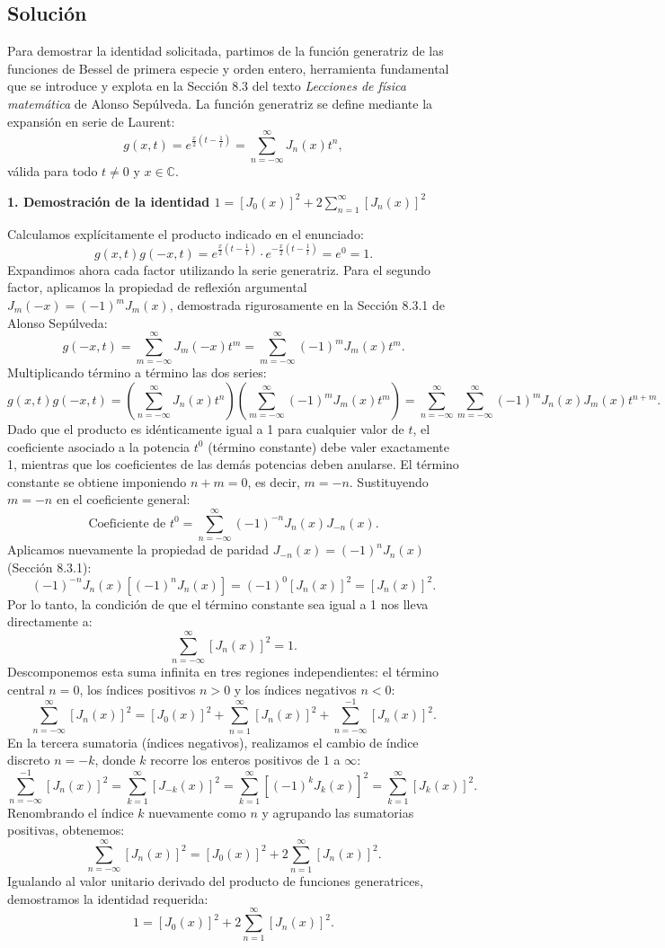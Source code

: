 \documentclass[a4paper]{article}
\begin{document}
\subsection{Solución}
Para demostrar la identidad solicitada, partimos de la función generatriz de las funciones de Bessel de primera especie y orden entero, herramienta fundamental que se introduce y explota en la Sección 8.3 del texto \textit{Lecciones de física matemática} de Alonso Sepúlveda. La función generatriz se define mediante la expansión en serie de Laurent:
$$g(x, t) = e^{\frac{x}{2}\left(t - \frac{1}{t}\right)} = \sum_{n=-\infty}^{\infty} J_n(x) t^n,$$
válida para todo $t \neq 0$ y $x \in \mathbb{C}$.

\textbf{1. Demostración de la identidad $1=[J_0(x)]^2+2\sum_{n=1}^{\infty}[J_n(x)]^2$}

Calculamos explícitamente el producto indicado en el enunciado:
$$g(x, t)g(-x, t) = e^{\frac{x}{2}\left(t - \frac{1}{t}\right)} \cdot e^{-\frac{x}{2}\left(t - \frac{1}{t}\right)} = e^0 = 1.$$
Expandimos ahora cada factor utilizando la serie generatriz. Para el segundo factor, aplicamos la propiedad de reflexión argumental $J_m(-x) = (-1)^m J_m(x)$, demostrada rigurosamente en la Sección 8.3.1 de Alonso Sepúlveda:
$$g(-x, t) = \sum_{m=-\infty}^{\infty} J_m(-x) t^m = \sum_{m=-\infty}^{\infty} (-1)^m J_m(x) t^m.$$
Multiplicando término a término las dos series:
$$g(x, t)g(-x, t) = \left(\sum_{n=-\infty}^{\infty} J_n(x) t^n\right) \left(\sum_{m=-\infty}^{\infty} (-1)^m J_m(x) t^m\right) = \sum_{n=-\infty}^{\infty} \sum_{m=-\infty}^{\infty} (-1)^m J_n(x) J_m(x) t^{n+m}.$$
Dado que el producto es idénticamente igual a 1 para cualquier valor de $t$, el coeficiente asociado a la potencia $t^0$ (término constante) debe valer exactamente 1, mientras que los coeficientes de las demás potencias deben anularse. El término constante se obtiene imponiendo $n+m=0$, es decir, $m=-n$. Sustituyendo $m=-n$ en el coeficiente general:
$$\text{Coeficiente de } t^0 = \sum_{n=-\infty}^{\infty} (-1)^{-n} J_n(x) J_{-n}(x).$$
Aplicamos nuevamente la propiedad de paridad $J_{-n}(x) = (-1)^n J_n(x)$ (Sección 8.3.1):
$$(-1)^{-n} J_n(x) \left[(-1)^n J_n(x)\right] = (-1)^0 [J_n(x)]^2 = [J_n(x)]^2.$$
Por lo tanto, la condición de que el término constante sea igual a 1 nos lleva directamente a:
$$\sum_{n=-\infty}^{\infty} [J_n(x)]^2 = 1.$$
Descomponemos esta suma infinita en tres regiones independientes: el término central $n=0$, los índices positivos $n>0$ y los índices negativos $n<0$:
$$\sum_{n=-\infty}^{\infty} [J_n(x)]^2 = [J_0(x)]^2 + \sum_{n=1}^{\infty} [J_n(x)]^2 + \sum_{n=-\infty}^{-1} [J_n(x)]^2.$$
En la tercera sumatoria (índices negativos), realizamos el cambio de índice discreto $n = -k$, donde $k$ recorre los enteros positivos de $1$ a $\infty$:
$$\sum_{n=-\infty}^{-1} [J_n(x)]^2 = \sum_{k=1}^{\infty} [J_{-k}(x)]^2 = \sum_{k=1}^{\infty} \left[(-1)^k J_k(x)\right]^2 = \sum_{k=1}^{\infty} [J_k(x)]^2.$$
Renombrando el índice $k$ nuevamente como $n$ y agrupando las sumatorias positivas, obtenemos:
$$\sum_{n=-\infty}^{\infty} [J_n(x)]^2 = [J_0(x)]^2 + 2\sum_{n=1}^{\infty} [J_n(x)]^2.$$
Igualando al valor unitario derivado del producto de funciones generatrices, demostramos la identidad requerida:
$$1 = [J_0(x)]^2 + 2\sum_{n=1}^{\infty} [J_n(x)]^2.$$
\end{document}

